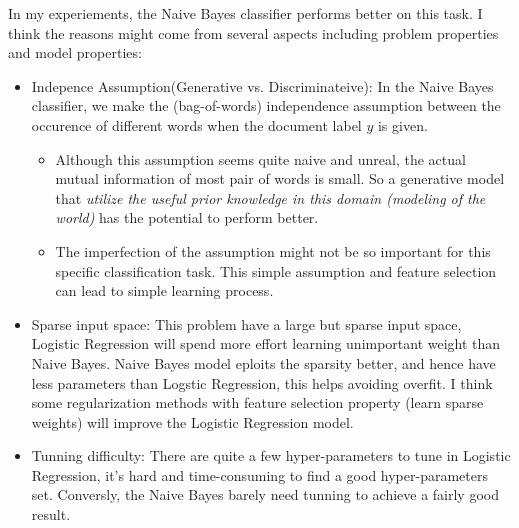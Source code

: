 \documentclass{article}
\theoremstyle{definition}
\theoremstyle{definition}
\theoremstyle{remark}
\begin{document}
\begin{addmargin}[3em]{2em}
  In my experiements, the Naive Bayes classifier performs better on this task. I think the reasons might come from several aspects including problem properties and model properties:
  \begin{itemize}
  \item Indepence Assumption(Generative vs. Discriminateive): In the Naive Bayes classifier, we make the (bag-of-words) independence assumption between the occurence of different words when the document label $y$ is given.
    \begin{itemize}
      \item Although this assumption seems quite naive and unreal, the actual mutual information of most pair of words is small. So a generative model that \textit{utilize the useful prior knowledge in this domain (modeling of the world)} has the potential to perform better.
      \item The imperfection of the assumption might not be so important for this specific classification task. This simple assumption and feature selection can lead to simple learning process.
    \end{itemize}
  \item Sparse input space: This problem have a large but sparse input space, Logistic Regression will spend more effort learning unimportant weight than Naive Bayes. Naive Bayes model eploits the sparsity better, and hence have less parameters than Logstic Regression, this helps avoiding overfit. I think some regularization methods with feature selection property (learn sparse weights) will improve the Logistic Regression model.
  \item Tunning difficulty: There are quite a few hyper-parameters to tune in Logistic Regression, it's hard and time-consuming to find a good hyper-parameters set. Conversly, the Naive Bayes barely need tunning to achieve a fairly good result.
  \end{itemize}
\end{addmargin}




\end{document}
